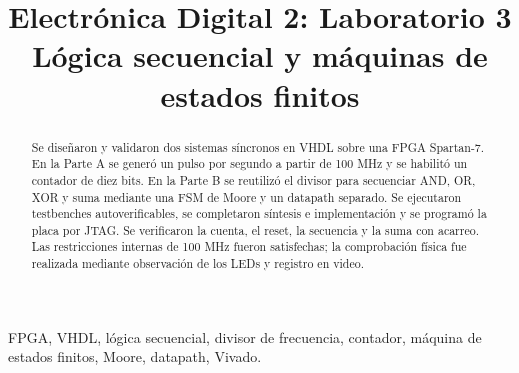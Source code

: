 \documentclass[conference]{IEEEtran}
\begin{document}
\title{Electrónica Digital 2: Laboratorio 3\\Lógica secuencial y máquinas de estados finitos}
\author{
}
\maketitle
\begin{abstract}
Se diseñaron y validaron dos sistemas síncronos en VHDL sobre una FPGA Spartan-7. En la Parte A se generó un pulso por segundo a partir de 100 MHz y se habilitó un contador de diez bits. En la Parte B se reutilizó el divisor para secuenciar AND, OR, XOR y suma mediante una FSM de Moore y un datapath separado. Se ejecutaron testbenches autoverificables, se completaron síntesis e implementación y se programó la placa por JTAG. Se verificaron la cuenta, el reset, la secuencia y la suma con acarreo. Las restricciones internas de 100 MHz fueron satisfechas; la comprobación física fue realizada mediante observación de los LEDs y registro en video.
\end{abstract}
\begin{IEEEkeywords}
FPGA, VHDL, lógica secuencial, divisor de frecuencia, contador, máquina de estados finitos, Moore, datapath, Vivado.
\end{IEEEkeywords}








\end{document}
